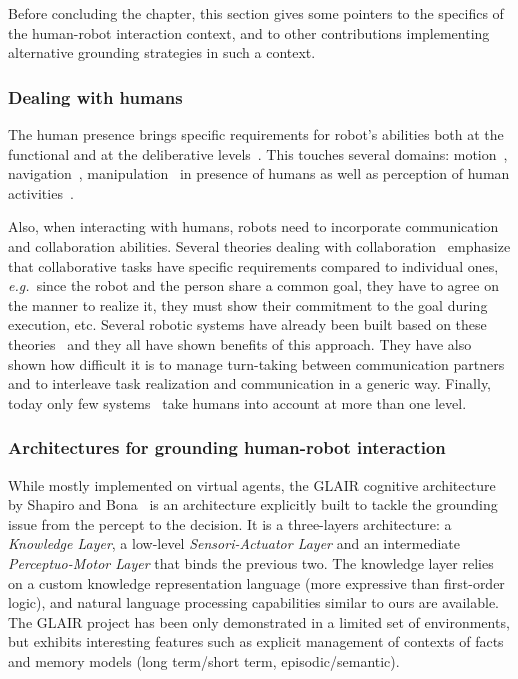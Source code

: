 \documentclass{svmult}
\newcommand{\eg}{{\textit{e.g.~}}}
\begin{document}
Before concluding the chapter, this section gives some pointers to the specifics of the human-robot interaction context, 
and to other contributions implementing alternative grounding strategies in such a context.

\subsubsection{Dealing with humans}

The human presence brings specific requirements for robot's abilities both at
the functional and at the deliberative levels~\cite{Klein2004}. This touches
several domains: motion~\cite{Kulic2007,Berg2004},
navigation~\cite{Althaus2004,Sisbot2007}, manipulation~\cite{Kemp2007} in
presence of humans as well as perception of human
activities~\cite{Breazeal2001,Burger2008}.

Also, when interacting with humans, robots need to incorporate communication
and collaboration abilities. Several theories dealing with
collaboration~\cite{Cohen1991,Grosz1996,Clark1996} emphasize that collaborative
tasks have specific requirements compared to individual ones, \eg since the
robot and the person share a common goal, they have to agree on the manner to
realize it, they must show their commitment to the goal during execution, etc.
Several robotic systems have already been built based on these
theories~\cite{Rich1997,Sidner2005,Tambe1997,Breazeal2003} and they all have
shown benefits of this approach. They have also shown how difficult it is to
manage turn-taking between communication partners and to interleave task
realization and communication in a generic way. Finally, today only few
systems~\cite{Fong2006,Breazeal2003,Sisbot2008, Pandey2011} take humans into
account at more than one level.


\subsubsection{Architectures for grounding human-robot interaction}

While mostly implemented on virtual agents, the GLAIR cognitive architecture by
Shapiro and Bona~\cite{Shapiro2009} is an architecture explicitly built to
tackle the grounding issue from the percept to the decision. It is a
three-layers architecture: a \emph{Knowledge Layer}, a low-level
\emph{Sensori-Actuator Layer} and an intermediate \emph{Perceptuo-Motor Layer}
that binds the previous two.  The knowledge layer relies on a custom knowledge
representation language (more expressive than first-order logic), and natural
language processing capabilities similar to ours are available. The GLAIR
project has been only demonstrated in a limited set of environments, but
exhibits interesting features such as explicit management of contexts of facts
and memory models (long term/short term, episodic/semantic).
\end{document}
